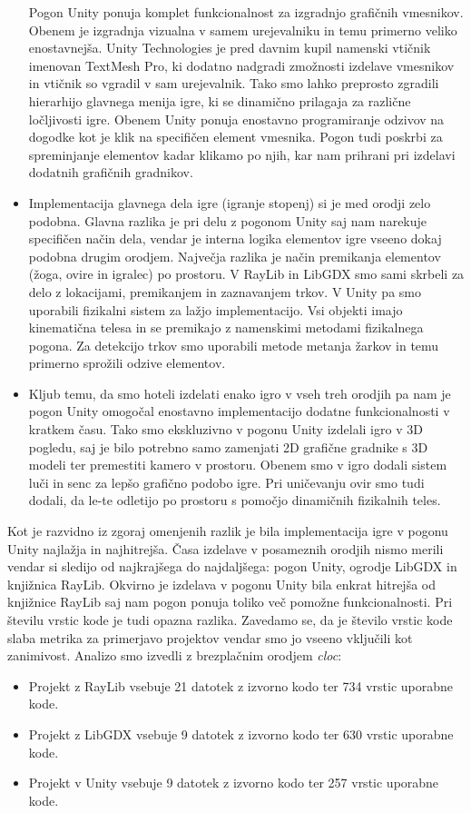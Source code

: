 \documentclass[12pt,a4paper,twoside]{book}
\begin{document}
\begin{itemize}
	Pogon Unity ponuja komplet funkcionalnost za izgradnjo grafičnih vmesnikov. Obenem je izgradnja vizualna v samem urejevalniku in temu primerno veliko enostavnejša. Unity Technologies je pred davnim kupil namenski vtičnik imenovan TextMesh Pro, ki dodatno nadgradi zmožnosti izdelave vmesnikov in vtičnik so vgradil v sam urejevalnik. Tako smo lahko preprosto zgradili hierarhijo glavnega menija igre, ki se dinamično prilagaja za različne ločljivosti igre. Obenem Unity ponuja enostavno programiranje odzivov na dogodke kot je klik na specifičen element vmesnika. Pogon tudi poskrbi za spreminjanje elementov kadar klikamo po njih, kar nam prihrani pri izdelavi dodatnih grafičnih gradnikov.
	\item Implementacija glavnega dela igre (igranje stopenj) si je med orodji zelo podobna. Glavna razlika je pri delu z pogonom Unity saj nam narekuje specifičen način dela, vendar je interna logika elementov igre vseeno dokaj podobna drugim orodjem. Največja razlika je način premikanja elementov (žoga, ovire in igralec) po prostoru. V RayLib in LibGDX smo sami skrbeli za delo z lokacijami, premikanjem in zaznavanjem trkov. V Unity pa smo uporabili fizikalni sistem za lažjo implementacijo. Vsi objekti imajo kinematična telesa in se premikajo z namenskimi metodami fizikalnega pogona. Za detekcijo trkov smo uporabili metode metanja žarkov in temu primerno sprožili odzive elementov.
	\item Kljub temu, da smo hoteli izdelati enako igro v vseh treh orodjih pa nam je pogon Unity omogočal enostavno implementacijo dodatne funkcionalnosti v kratkem času. Tako smo ekskluzivno v pogonu Unity izdelali igro v 3D pogledu, saj je bilo potrebno samo zamenjati 2D grafične gradnike s 3D modeli ter premestiti kamero v prostoru. Obenem smo v igro dodali sistem luči in senc za lepšo grafično podobo igre. Pri uničevanju ovir smo tudi dodali, da le-te odletijo po prostoru s pomočjo dinamičnih fizikalnih teles.
\end{itemize}

Kot je razvidno iz zgoraj omenjenih razlik je bila implementacija igre v pogonu Unity najlažja in najhitrejša. Časa izdelave v posameznih orodjih nismo merili vendar si sledijo od najkrajšega do najdaljšega: pogon Unity, ogrodje LibGDX in knjižnica RayLib. Okvirno je izdelava v pogonu Unity bila enkrat hitrejša od knjižnice RayLib saj nam pogon ponuja toliko več pomožne funkcionalnosti. Pri številu vrstic kode je tudi opazna razlika. Zavedamo se, da je število vrstic kode slaba metrika za primerjavo projektov vendar smo jo vseeno vključili kot zanimivost. Analizo smo izvedli z brezplačnim orodjem \textit{cloc}:
\begin{itemize}
	\item Projekt z RayLib vsebuje 21 datotek z izvorno kodo ter 734 vrstic uporabne kode.
	\item Projekt z LibGDX vsebuje 9 datotek z izvorno kodo ter 630 vrstic uporabne kode.
	\item Projekt v Unity  vsebuje 9 datotek z izvorno kodo ter 257 vrstic uporabne kode.
\end{itemize} 
\end{document}
